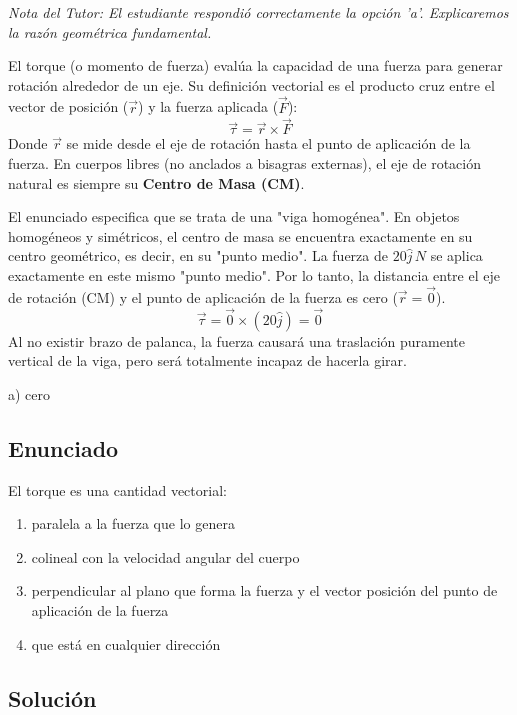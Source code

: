 \documentclass[12pt, a4paper]{article}
\begin{document}
\textit{Nota del Tutor: El estudiante respondió correctamente la opción 'a'. Explicaremos la razón geométrica fundamental.}

El torque (o momento de fuerza) evalúa la capacidad de una fuerza para generar rotación alrededor de un eje. Su definición vectorial es el producto cruz entre el vector de posición ($\vec{r}$) y la fuerza aplicada ($\vec{F}$):
$$ \vec{\tau} = \vec{r} \times \vec{F} $$
Donde $\vec{r}$ se mide desde el eje de rotación hasta el punto de aplicación de la fuerza.
En cuerpos libres (no anclados a bisagras externas), el eje de rotación natural es siempre su \textbf{Centro de Masa (CM)}.

El enunciado especifica que se trata de una "viga homogénea". En objetos homogéneos y simétricos, el centro de masa se encuentra exactamente en su centro geométrico, es decir, en su "punto medio".
La fuerza de $20\hat{j}\,\si{N}$ se aplica exactamente en este mismo "punto medio". 
Por lo tanto, la distancia entre el eje de rotación (CM) y el punto de aplicación de la fuerza es cero ($\vec{r} = \vec{0}$).
$$ \vec{\tau} = \vec{0} \times (20\hat{j}) = \vec{0} $$
Al no existir brazo de palanca, la fuerza causará una traslación puramente vertical de la viga, pero será totalmente incapaz de hacerla girar.

\begin{tcolorbox}[colback=green!5!white, colframe=green!50!black, title=Respuesta Final]
\centering \Large a) cero
\end{tcolorbox}

\newpage

\subsection*{Enunciado}
El torque es una cantidad vectorial:
\begin{enumerate}[label=\alph*)]
    \item paralela a la fuerza que lo genera
    \item colineal con la velocidad angular del cuerpo
    \item perpendicular al plano que forma la fuerza y el vector posición del punto de aplicación de la fuerza
    \item que está en cualquier dirección
\end{enumerate}

\subsection*{Solución}
\end{document}

